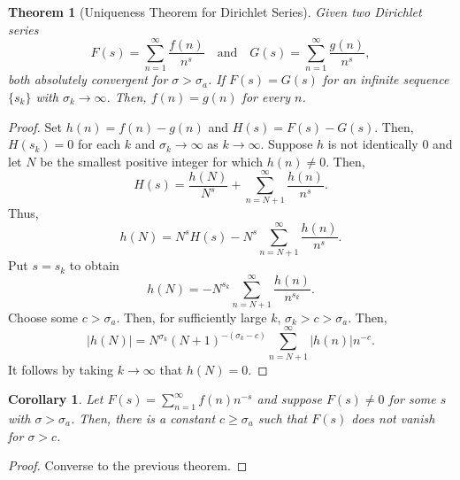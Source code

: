 \documentclass[12pt]{article}
\theoremstyle{thmstyle}
\newtheorem{theorem}{Theorem}[section]
\theoremstyle{defstyle}
\newtheorem*{corollary}{Corollary}
\renewcommand{\ge}{\geqslant}
\begin{document}
\begin{theorem}[Uniqueness Theorem for Dirichlet Series]
    Given two Dirichlet series 
    \begin{equation*}
        F(s) = \sum_{n = 1}^\infty\frac{f(n)}{n^s}\quad\text{and}\quad G(s) = \sum_{n = 1}^\infty\frac{g(n)}{n^s},
    \end{equation*}
    both absolutely convergent for $\sigma > \sigma_a$. If $F(s) = G(s)$ for an infinite sequence $\{s_k\}$ with $\sigma_k\to\infty$. Then, $f(n) = g(n)$ for every $n$.
\end{theorem}
\begin{proof}
    Set $h(n) = f(n) - g(n)$ and $H(s) = F(s) - G(s)$. Then, $H(s_k) = 0$ for each $k$ and $\sigma_k\to\infty$ as $k\to\infty$. Suppose $h$ is not identically $0$ and let $N$ be the smallest positive integer for which $h(n)\ne 0$. Then, 
    \begin{equation*}
        H(s) = \frac{h(N)}{N^s} + \sum_{n = N + 1}^\infty \frac{h(n)}{n^s}.
    \end{equation*}
    Thus, 
    \begin{equation*}
        h(N) = N^sH(s) - N^{s}\sum_{n = N + 1}^\infty\frac{h(n)}{n^s}.
    \end{equation*}
    Put $s = s_k$ to obtain 
    \begin{equation*}
        h(N) = - N^{s_k}\sum_{n = N + 1}^\infty\frac{h(n)}{n^{s_k}}.
    \end{equation*}
    Choose some $c > \sigma_a$. Then, for sufficiently large $k$, $\sigma_k > c > \sigma_a$. Then, 
    \begin{equation*}
        |h(N)| = N^{\sigma_k} (N + 1)^{-(\sigma_k - c)}\sum_{n = N + 1}^\infty |h(n)|n^{-c}.
    \end{equation*}
    It follows by taking $k\to\infty$ that $h(N) = 0$.
\end{proof}

\begin{corollary}
    Let $F(s) = \sum_{n = 1}^\infty f(n)n^{-s}$ and suppose $F(s)\ne 0$ for some $s$ with $\sigma > \sigma_a$. Then, there is a constant $c\ge\sigma_a$ such that $F(s)$ does not vanish for $\sigma > c$.
\end{corollary}
\begin{proof}
    Converse to the previous theorem.
\end{proof}
\end{document}
